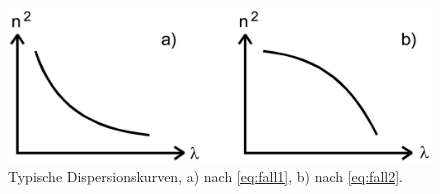 \begin{figure}[h!tbp]
	\centering
	\includegraphics[width=0.7\linewidth]{dispersionskurven.png}
	\caption{Typische Dispersionskurven, a) nach \ref{eq:fall1}, b) nach \ref{eq:fall2}.\cite[7]{anleitung402}}
	\label{fig:dispersionskurven}
\end{figure}
